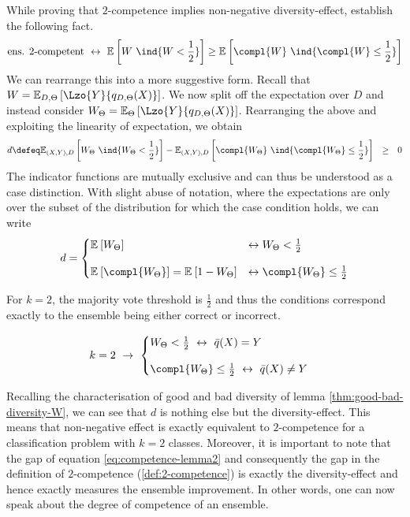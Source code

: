 \documentclass[../main.tex]{subfiles}
\begin{document}
While proving that $2$-competence implies non-negative diversity-effect, \citeauthor{theisen_WhenAreEnsembles_2023} establish the following fact.
\begin{align}
\label{eq:competence-lemma2}
\text{ens. $2$-competent} ~\leftrightarrow~ \mathbb{E}_{}\left[ W~\ind{W < \frac{1}{2}} \right] \geq \mathbb{E}_{}\left[ 
\compl{W}~\ind{\compl{W} \leq \frac{1}{2} } 
\right] 
\end{align}
We can rearrange this into a more suggestive form. Recall that $W = \mathbb{E}_{D, \Theta}\left[ \Lzo{Y}{q_{D,\Theta}(X)} \right]$. We now split off the expectation over $D$ and instead consider $W_{\Theta} = \mathbb{E}_{\Theta}\left[ \Lzo{Y}{q_{D, \Theta}(X)} \right]$. Rearranging the above and exploiting the linearity of expectation, we obtain
$$
d \defeq \mathbb{E}_{(X,Y),D }\left[ W_{\Theta} ~\ind{W_{\Theta} < \frac{1}{2}} \right]  - \mathbb{E}_{(X,Y) ,D}\left[ \compl{W_{\Theta}} ~\ind{\compl{W_{\Theta}} \leq \frac{1}{2} } \right] ~ ~ \geq ~ ~  0
$$
The indicator functions are mutually exclusive and can thus be understood as a case distinction. With slight abuse of notation, where the expectations are only over the subset of the distribution for which the case condition holds, we can write
$$
d = 
\begin{cases}
\mathbb{E}_{}\left[ W_{\Theta} \right] & \leftrightarrow W_{\Theta} < \frac{1}{2} \\[1em]
\mathbb{E}_{}\left[ \compl{W_{\Theta}}  \right]  = \mathbb{E}_{}\left[ 1 - W_{\Theta} \right]  & \leftrightarrow \compl{W_{\Theta}} \leq \frac{1}{2} 
\end{cases}
$$

For $k=2$, the majority vote threshold is $\frac{1}{2}$ and thus the conditions correspond exactly to the ensemble being either correct or incorrect.

\begin{align}
\label{eq:gen-error-ratio-binary}
k = 2 ~\rightarrow~ 
\begin{cases}
W_{\Theta}  < \frac{1}{2} ~\leftrightarrow~  \bar{q}(X) = Y \\[1em]
\compl{W_\Theta }  \leq \frac{1}{2} ~\leftrightarrow~ \bar{q}(X) \not= Y
\end{cases}
\end{align}

Recalling the characterisation of good and bad diversity of lemma \ref{thm:good-bad-diversity-W}, we can see that $d$ is nothing else but the diversity-effect. This means that non-negative effect is exactly equivalent to $2$-competence for a classification problem with $k=2$ classes.
Moreover, it is important to note that the gap of equation \ref{eq:competence-lemma2} and consequently the gap in the definition of $2$-competence (\ref{def:2-competence}) is exactly the diversity-effect and hence exactly measures the ensemble improvement. In other words, one can now speak about the degree of competence of an ensemble.
\end{document}
